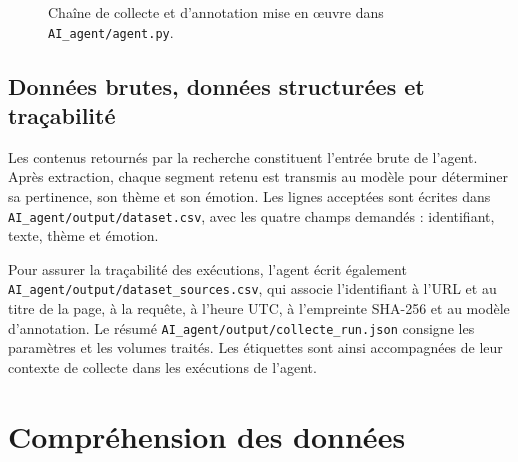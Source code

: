 \documentclass[11pt,a4paper]{article}
\begin{document}
\begin{figure}[H]
\centering
{}
\caption{Chaîne de collecte et d'annotation mise en œuvre dans \texttt{AI\_agent/agent.py}.}
\end{figure}

\subsection{Données brutes, données structurées et traçabilité}
Les contenus retournés par la recherche constituent l'entrée brute de l'agent. Après extraction, chaque segment retenu est transmis au modèle pour déterminer sa pertinence, son thème et son émotion. Les lignes acceptées sont écrites dans \texttt{AI\_agent/output/dataset.csv}, avec les quatre champs demandés : identifiant, texte, thème et émotion.

Pour assurer la traçabilité des exécutions, l'agent écrit également \texttt{AI\_agent/output/dataset\_sources.csv}, qui associe l'identifiant à l'URL et au titre de la page, à la requête, à l'heure UTC, à l'empreinte SHA-256 et au modèle d'annotation. Le résumé \texttt{AI\_agent/output/collecte\_run.json} consigne les paramètres et les volumes traités. Les étiquettes sont ainsi accompagnées de leur contexte de collecte dans les exécutions de l'agent.

\section{Compréhension des données}
\end{document}
